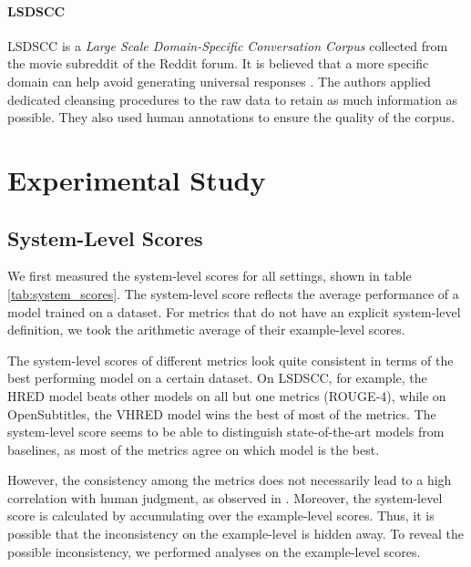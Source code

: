 \documentclass[runningheads]{llncs}
\begin{document}
    \paragraph{LSDSCC}
    LSDSCC \cite{LSDSCC} is a \emph{Large Scale Domain-Specific Conversation Corpus} collected from the movie subreddit of the Reddit forum. It is believed that a more specific domain can help avoid generating universal responses \cite{LSDSCC}. The authors applied dedicated cleansing procedures to the raw data to retain as much information as possible. They also used human annotations to ensure the quality of the corpus.

    \section{Experimental Study}
    \subsection{System-Level Scores}
    We first measured the system-level scores for all settings, shown in table \ref{tab:system_scores}. The system-level score reflects the average performance of a model trained on a dataset. For metrics that do not have an explicit system-level definition, we took the arithmetic average of their example-level scores.
    

    The system-level scores of different metrics look quite consistent in terms of the best performing model on a certain dataset. On LSDSCC, for example, the HRED model beats other models on all but one metrics (ROUGE-4), while on OpenSubtitles, the VHRED model wins the best of most of the metrics. The system-level score seems to be able to distinguish state-of-the-art models from baselines, as most of the metrics agree on which model is the best.

    However, the consistency among the metrics does not necessarily lead to a high correlation with human judgment, as observed in \cite{HowNot}. Moreover, the system-level score is calculated by accumulating over the example-level scores. Thus, it is possible that the inconsistency on the example-level is hidden away. To reveal the possible inconsistency, we performed analyses on the example-level scores.
\end{document}
